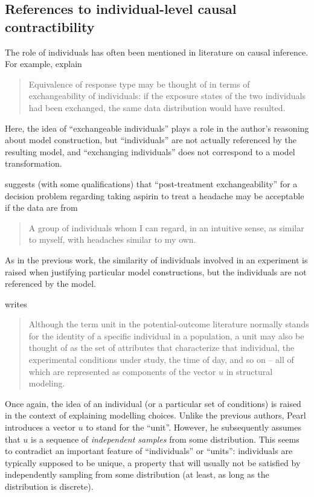\subsection{References to individual-level causal contractibility}

The role of individuals has often been mentioned in literature on causal inference. For example, \citet{greenland_identifiability_1986} explain
\begin{quote}
    Equivalence of response type may be thought of in terms of exchangeability of individuals: if the exposure states of the two individuals had been exchanged, the same data distribution would have resulted.
\end{quote}
Here, the idea of ``exchangeable individuals'' plays a role in the author's reasoning about model construction, but ``individuals'' are not actually referenced by the resulting model, and ``exchanging individuals'' does not correspond to a model transformation.

\citet{dawid_decision-theoretic_2020} suggests (with some qualifications) that ``post-treatment exchangeability'' for a decision problem regarding taking aspirin to treat a headache may be acceptable if the data are from
\begin{quote}
    A group of individuals whom I can regard, in an intuitive sense, as similar to myself, with headaches similar to my own.
\end{quote}
As in the previous work, the similarity of individuals involved in an experiment is raised when justifying particular model constructions, but the individuals are not referenced by the model.

\citet[pg. 98]{pearl_causality:_2009} writes
\begin{quote}
    Although the term unit in the potential-outcome literature normally stands for the identity of a specific individual in a population, a unit may also be thought of as the set of attributes that characterize that individual, the experimental conditions under study, the time of day, and so on – all of which are represented as components of the vector $u$ in structural modeling.
\end{quote}
Once again, the idea of an individual (or a particular set of conditions) is raised in the context of explaining modelling choices. Unlike the previous authors, Pearl introduces a vector $u$ to stand for the ``unit''. However, he subsequently assumes that $u$ is a sequence of \emph{independent samples} from some distribution. This seems to contradict an important feature of ``individuals'' or ``units'': individuals are typically supposed to be unique, a property that will usually not be satisfied by independently sampling from some distribution (at least, as long as the distribution is discrete).

